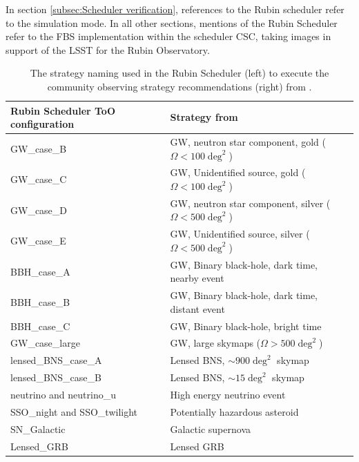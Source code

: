 In section \ref{subsec:Scheduler verification}, references to the Rubin scheduler refer to the simulation mode. In all other sections, mentions of the Rubin Scheduler refer to the FBS implementation within the scheduler CSC, taking images in support of the LSST for the Rubin Observatory.

\begin{table}[]
\centering
\begin{tabular}{|l|l|}
\hline
\textbf{Rubin Scheduler ToO configuration} & \textbf{Strategy from \cite{RubinToO2024}} \\ \hline \hline
GW\_case\_B                         & GW, neutron star component, gold ($\Omega <100\deg^2$)                                             \\ \hline
GW\_case\_C                         & GW, Unidentified source, gold ($\Omega <100\deg^2$)                                   \\ \hline
GW\_case\_D                         & GW, neutron star component, silver ($\Omega <500\deg^2$)                                           \\ \hline
GW\_case\_E                         & GW, Unidentified source, silver ($\Omega <500\deg^2$)                                 \\ \hline
BBH\_case\_A                        & GW, Binary black-hole, dark time, nearby event                                     \\ \hline
BBH\_case\_B                        & GW, Binary black-hole, dark time, distant event                                      \\ \hline
BBH\_case\_C                        & GW, Binary black-hole, bright time                                         \\ \hline
GW\_case\_large                     & GW, large skymaps ($\Omega>500\deg^2$)                                    \\ \hline
lensed\_BNS\_case\_A                & Lensed BNS, $\sim900\deg^2$ skymap                                      \\ \hline
lensed\_BNS\_case\_B                & Lensed BNS, $\sim15\deg^2$ skymap                                       \\ \hline
neutrino and neutrino\_u            & High energy neutrino event                                            \\ \hline
SSO\_night and SSO\_twilight                       & Potentially hazardous asteroid                                           \\ \hline
SN\_Galactic                        & Galactic supernova                                  \\ \hline
Lensed\_GRB                         & Lensed GRB                                          \\ \hline
\end{tabular}
\caption{The strategy naming used in the Rubin Scheduler (left) to execute the community observing strategy recommendations (right) from \cite{RubinToO2024}.}
\label{table:ToOStrategies_sched}
\end{table}

